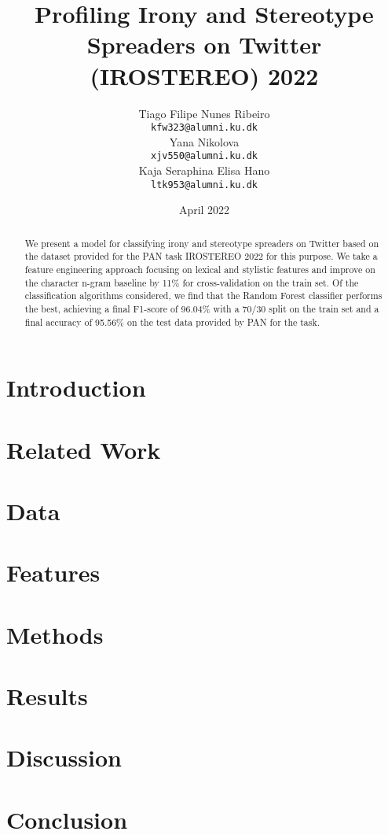\documentclass[11pt]{article}
\title{Profiling Irony and Stereotype Spreaders on Twitter (IROSTEREO) 2022}
\author{Tiago Filipe Nunes Ribeiro \\
  {\tt{kfw323@alumni.ku.dk}}\\\And
  Yana Nikolova \\
  {\tt{xjv550@alumni.ku.dk}} \\\And
  Kaja Seraphina Elisa Hano\\
  \tt{ltk953@alumni.ku.dk} \\}
\date{April 2022}
\date{}
\newcommand{\charactercount}[1]{
\immediate\write18{
    expr `texcount -1 -sum -merge #1.tex` + `texcount -1 -sum -merge -char #1.tex` - 1 
    > chars.txt
}}
\begin{document}
\maketitle


\begin{abstract}
We present a model for classifying irony and stereotype spreaders on Twitter based on the dataset provided for the PAN task IROSTEREO 2022 for this purpose. We take a feature engineering approach focusing on lexical and stylistic features and improve on the character n-gram baseline by 11\% for cross-validation on the train set. Of the classification algorithms considered, we find that the Random Forest classifier performs the best, achieving a final F1-score of 96.04\% with a 70/30 split on the train set and a final accuracy of 95.56\% on the test data provided by PAN for the task.
\end{abstract}



\section{Introduction}


\section{Related Work}


\section{Data}


\section{Features}


\section{Methods}


\section{Results}


\section{Discussion}


\section{Conclusion}





\clearpage

\end{document}
